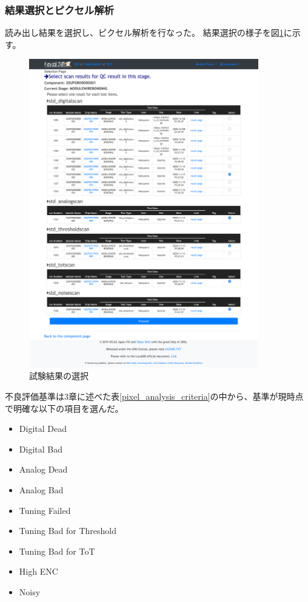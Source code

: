 \newpage
\subsubsection{結果選択とピクセル解析}
読み出し結果を選択し、ピクセル解析を行なった。
結果選択の様子を図\ref{demo_select_scans}に示す。
\begin{figure}[bpt]\centering
  \begin{center}
    \includegraphics[width=10cm]{demo_select_scans}
  \caption[試験結果の選択]{試験結果の選択}
  \label{demo_select_scans}
  \end{center}
\end{figure}

不良評価基準は3章に述べた表\ref{pixel_analysis_criteria}の中から、基準が現時点で明確な以下の項目を選んだ。
\begin{itemize}
  \item Digital Dead 
  \item Digital Bad 
  \item Analog Dead 
  \item Analog Bad 
  \item Tuning Failed
  \item Tuning Bad for Threshold
  \item Tuning Bad for ToT
  \item High ENC
  \item Noisy
\end{itemize}

